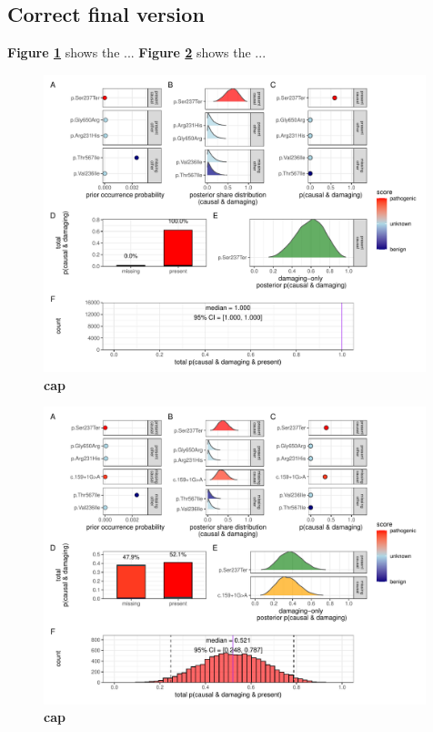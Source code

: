 \subsection{Correct final version}
\textbf{Figure \ref{fig:plot_scenario_1_quant_uncert_ci}} shows the ...
\textbf{Figure \ref{fig:plot_scenario_2_quant_uncert_ci}} shows the ...




\begin{figure}[ht]
  \centering
  \includegraphics[width=0.99\textwidth]{../images/plot_scenario_1_quant_uncert_ci.pdf}
  \caption{
   \textbf{cap}
  }
  \label{fig:plot_scenario_1_quant_uncert_ci}
\end{figure}

\begin{figure}[ht]
  \centering
  \includegraphics[width=0.99\textwidth]{../images/plot_scenario_2_quant_uncert_ci.pdf}
  \caption{
   \textbf{cap}
  }
  \label{fig:plot_scenario_2_quant_uncert_ci}
\end{figure}

\FloatBarrier





